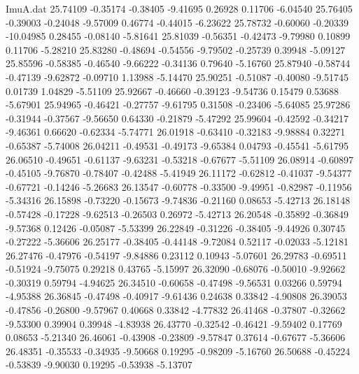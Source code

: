\begin{filecontents}{ImuA.dat}
  25.74109   -0.35174   -0.38405   -9.41695    0.26928    0.11706   -6.04540
  25.76405   -0.39003   -0.24048   -9.57009    0.46774   -0.44015   -6.23622
  25.78732   -0.60060   -0.20339  -10.04985    0.28455   -0.08140   -5.81641
  25.81039   -0.56351   -0.42473   -9.79980    0.10899    0.11706   -5.28210
  25.83280   -0.48694   -0.54556   -9.79502   -0.25739    0.39948   -5.09127
  25.85596   -0.58385   -0.46540   -9.66222   -0.34136    0.79640   -5.16760
  25.87940   -0.58744   -0.47139   -9.62872   -0.09710    1.13988   -5.14470
  25.90251   -0.51087   -0.40080   -9.51745    0.01739    1.04829   -5.51109
  25.92667   -0.46660   -0.39123   -9.54736    0.15479    0.53688   -5.67901
  25.94965   -0.46421   -0.27757   -9.61795    0.31508   -0.23406   -5.64085
  25.97286   -0.31944   -0.37567   -9.56650    0.64330   -0.21879   -5.47292
  25.99604   -0.42592   -0.34217   -9.46361    0.66620   -0.62334   -5.74771
  26.01918   -0.63410   -0.32183   -9.98884    0.32271   -0.65387   -5.74008
  26.04211   -0.49531   -0.49173   -9.65384    0.04793   -0.45541   -5.61795
  26.06510   -0.49651   -0.61137   -9.63231   -0.53218   -0.67677   -5.51109
  26.08914   -0.60897   -0.45105   -9.76870   -0.78407   -0.42488   -5.41949
  26.11172   -0.62812   -0.41037   -9.54377   -0.67721   -0.14246   -5.26683
  26.13547   -0.60778   -0.33500   -9.49951   -0.82987   -0.11956   -5.34316
  26.15898   -0.73220   -0.15673   -9.74836   -0.21160    0.08653   -5.42713
  26.18148   -0.57428   -0.17228   -9.62513   -0.26503    0.26972   -5.42713
  26.20548   -0.35892   -0.36849   -9.57368    0.12426   -0.05087   -5.53399
  26.22849   -0.31226   -0.38405   -9.44926    0.30745   -0.27222   -5.36606
  26.25177   -0.38405   -0.44148   -9.72084    0.52117   -0.02033   -5.12181
  26.27476   -0.47976   -0.54197   -9.84886    0.23112    0.10943   -5.07601
  26.29783   -0.69511   -0.51924   -9.75075    0.29218    0.43765   -5.15997
  26.32090   -0.68076   -0.50010   -9.92662   -0.30319    0.59794   -4.94625
  26.34510   -0.60658   -0.47498   -9.56531    0.03266    0.59794   -4.95388
  26.36845   -0.47498   -0.40917   -9.61436    0.24638    0.33842   -4.90808
  26.39053   -0.47856   -0.26800   -9.57967    0.40668    0.33842   -4.77832
  26.41468   -0.37807   -0.32662   -9.53300    0.39904    0.39948   -4.83938
  26.43770   -0.32542   -0.46421   -9.59402    0.17769    0.08653   -5.21340
  26.46061   -0.43908   -0.23809   -9.57847    0.37614   -0.67677   -5.36606
  26.48351   -0.35533   -0.34935   -9.50668    0.19295   -0.98209   -5.16760
  26.50688   -0.45224   -0.53839   -9.90030    0.19295   -0.53938   -5.13707

\end{filecontents}
